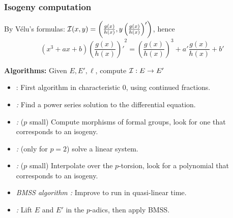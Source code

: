\documentclass[10pt,usepdftitle=false]{beamer}
\begin{document}
\begin{frame}
  \frametitle{Isogeny computation}
  By Vélu's formulas: $\mathcal{I}(x,y) = \left(\frac{g(x)}{h(x)},
    y\left(\frac{g(x)}{h(x)}\right)'\right)$, hence
  \[(x^3 + ax + b){\left(\frac{g(x)}{h(x)}\right)'}^2 =
  \left(\frac{g(x)}{h(x)}\right)^3 + a'\frac{g(x)}{h(x)} + b'\]
  
  \begin{block}{\textbf{Algorithms:} Given $E, E', \ell$, compute $\mathcal{I}:E\to E'$}
    \begin{itemize}
    \item \emph{\cite{strak73}}: First algorithm in characteristic
      $0$, using continued fractions.
    \item \emph{\cite{elkies92,elkies98}:} Find a power series
      solution to the differential equation.
    \item \emph{\cite{couveignes94}:} ($p$ small) Compute morphisms of
      formal groups, look for one that corresponds to an isogeny.
    \item \emph{\cite{lercier96}:} (only for $p=2$) solve a linear
      system.
    \item \emph{\cite{couveignes96}:} ($p$ small) Interpolate over the
      $p$-torsion, look for a polynomial that corresponds to an
      isogeny.
    \item \emph{BMSS
        algorithm \parencite{bostan+morain+salvy+schost08}:} Improve
      \cite{elkies98} to run in quasi-linear time.
    \item \emph{\cite{lercier+sirvent08}:} Lift $E$ and $E'$ in the
      $p$-adics, then apply BMSS.
    \end{itemize}
  \end{block}
\end{frame}

\end{document}
